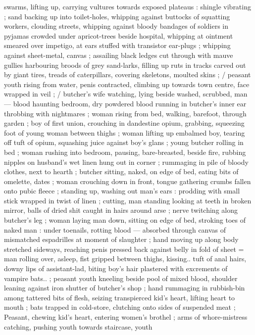 swarms, lifting up, carrying vultures towards exposed plateaus :
shingle vibrating ; sand backing up into toilet-holes, whipping
against buttocks of squatting workers, clouding streets, whipping
against bloody bandages of soldiers in pyjamas crowded under
apricot-trees beside hospital, whipping at ointment smeared over
impetigo, at ears stuffed with transistor ear-plugs ; whipping against
sheet-metal, canvas ; assailing black ledges cut through with mauve
gullies harbouring broods of grey sand-larks, filling up ruts in tracks
carved out by giant tires, treads of caterpillars, covering skeletons,
moulted skins ; / peasant youth rising from water, penis contracted,
climbing up towards town centre, face wrapped in veil ; / butcher's
wife watching, lying beside washed, scrubbed, man --- blood
haunting bedroom, dry powdered blood running in butcher's inner
ear throbbing with nightmares ; woman rising from bed, walking,
barefoot, through garden ; boy of first union, crouching in
dandestine opium, grabbing, squeezing foot of young woman
between thighs ; woman lifting up embalmed boy, tearing off tuft of
opium, squashing juice against boy's glans ; young butcher rolling in
bed ; woman rushing into bedroom, pausing, bare-breasted, beside
fire, rubbing nipples on husband's wet linen hung out in corner ;
rummaging in pile of bloody clothes, next to hearth ; butcher sitting,
naked, on edge of bed, eating bits of omelette, dates ; woman
crouching down in front, tongue gathering crumbs fallen onto pubic
fleece ; standing up, washing out man's ears : prodding with small
stick wrapped in twist of linen ; cutting, man standing looking at teeth
in broken mirror, balls of dried shit caught in hairs around arse ;
nerve twitching along butcher's leg ; woman laying man down, sitting
on edge of bed, stroking toes of naked man : under toenails, rotting
blood --- absorbed through canvas of mismatched espadrilles at
moment of slaughter ; hand moving up along body stretched
sideways, reaching penis pressed back against belly in fold of sheet
= man rolling over, asleep, fist gripped between thighs, kissing.. tuft
of anal hairs, downy lips of assistant-lad, biting boy's hair plastered
with excrements of vampire bats.. ; peasant youth kneeling beside
pool of mixed blood, shoulder leaning against iron shutter of
butcher's shop ; hand rummaging in rubbish-bin among tattered bits
of flesh, seizing transpierced kid's heart, lifting heart to mouth ; bats
trapped in cold-store, clutching onto sides of suspended meat ;
Peasant, chewing kid's heart, entering women's brothel ; arms of
whore-mistress catching, pushing youth towards staircase, youth
